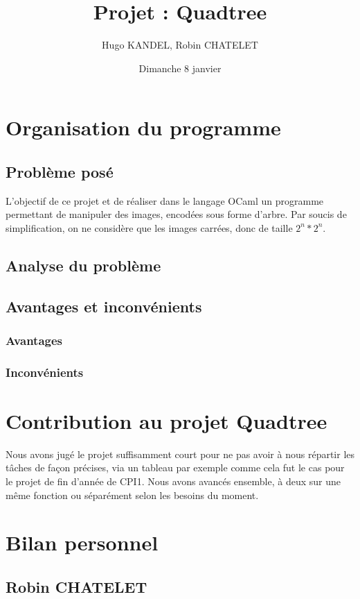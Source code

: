 \documentclass[12pt,a4paper]{article}
\title{Projet : Quadtree}
\author{Hugo KANDEL, Robin CHATELET}
\date{Dimanche 8 janvier}
\begin{document}
\maketitle
\pagebreak
\newpage
\tableofcontents
\pagebreak
\newpage

\section{Organisation du programme}
\subsection{Problème posé}
L'objectif de ce projet et de réaliser dans le langage OCaml un programme permettant de manipuler des images, encodées sous forme d’arbre. Par soucis de simplification, on ne considère que les images carrées, donc de taille $2^n * 2^n$.
\subsection{Analyse du problème}

\subsection{Avantages et inconvénients}
\subsubsection{Avantages}

\subsubsection{Inconvénients}

\section{Contribution au projet Quadtree}
Nous avons jugé le projet suffisamment court pour ne pas avoir à nous répartir les tâches de façon précises, via un tableau par exemple comme cela fut le cas pour le projet de fin d'année de CPI1. Nous avons avancés ensemble, à deux sur une même fonction ou séparément selon les besoins du moment.
\section{Bilan personnel}
\subsection{Robin CHATELET}
\end{document}
